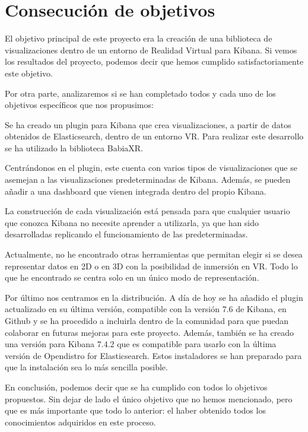 \documentclass[a4paper, 12pt]{book}
\begin{document}
\section{Consecución de objetivos}
\label{sec:objetivoscumplidos}

El objetivo principal de este proyecto era la creación de una biblioteca de visualizaciones dentro de un entorno de Realidad Virtual para Kibana. Si vemos los resultados del proyecto, podemos decir que hemos cumplido satisfactoriamente este objetivo.

Por otra parte, analizaremos si se han completado todos y cada uno de los objetivos específicos que nos propusimos:

Se ha creado un plugin para Kibana que crea visualizaciones, a partir de datos obtenidos de Elasticsearch, dentro de un entorno VR. Para realizar este desarrollo se ha utilizado la biblioteca BabiaXR.

Centrándonos en el plugin, este cuenta con varios tipos de visualizaciones que se asemejan a las visualizaciones predeterminadas de Kibana. Además, se pueden añadir a una dashboard que vienen integrada dentro del propio Kibana.

La construcción de cada visualización está pensada para que cualquier usuario que conozca Kibana no necesite aprender a utilizarla, ya que han sido desarrolladas replicando el funcionamiento de las predeterminadas.

Actualmente, no he encontrado otras herramientas que permitan elegir si se desea representar datos en 2D o en 3D con la posibilidad de inmersión en VR. Todo lo que he encontrado se centra solo en un único modo de representación.

Por último nos centramos en la distribución. A día de hoy se ha añadido el plugin actualizado en su última versión, compatible con la versión 7.6 de Kibana, en Github y se ha procedido a incluirla dentro de la comunidad para que puedan colaborar en futuras mejoras para este proyecto. Además, también se ha creado una versión para Kibana 7.4.2 que es compatible para usarlo con la última versión de Opendistro for Elasticsearch. Estos instaladores se han preparado para que la instalación sea lo más sencilla posible.


En conclusión, podemos decir que se ha cumplido con todos lo objetivos propuestos. Sin dejar de lado el único objetivo que no hemos mencionado, pero que es más importante que todo lo anterior: el haber obtenido todos los conocimientos adquiridos en este proceso.
\end{document}
